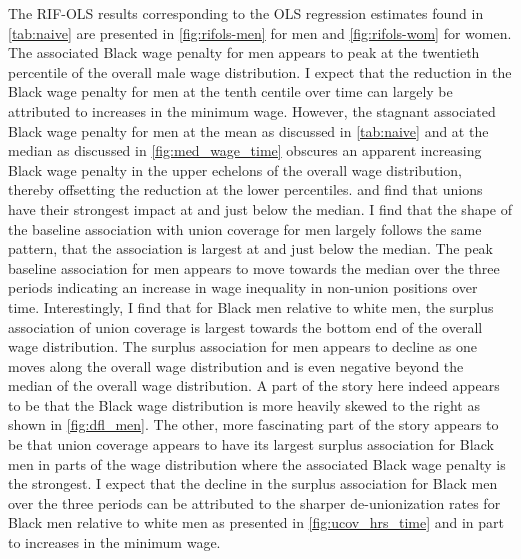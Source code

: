 \documentclass[11pt]{article}
\begin{document}
The RIF-OLS results corresponding to the OLS regression estimates found in \autoref{tab:naive} are presented in \autoref{fig:rifols-men} for men and \autoref{fig:rifols-wom} for women. The associated Black wage penalty for men appears to peak at the twentieth percentile of the overall male wage distribution. I expect that the reduction in the Black wage penalty for men at the tenth centile over time can largely be attributed to increases in the minimum wage. However, the stagnant associated Black wage penalty for men at the mean as discussed in \autoref{tab:naive} and at the median as discussed in \autoref{fig:med_wage_time} obscures an apparent increasing Black wage penalty in the upper echelons of the overall wage distribution, thereby offsetting the reduction at the lower percentiles. \citet{fll2021} and \citet{ffl2009} find that unions have their strongest impact at and just below the median. I find that the shape of the baseline association with union coverage for men largely follows the same pattern, that the association is largest at and just below the median. The peak baseline association for men appears to move towards the median over the three periods indicating an increase in wage inequality in non-union positions over time. Interestingly, I find that for Black men relative to white men, the surplus association of union coverage is largest towards the bottom end of the overall wage distribution. The surplus association for men appears to decline as one moves along the overall wage distribution and is even negative beyond the median of the overall wage distribution. A part of the story here indeed appears to be that the Black wage distribution is more heavily skewed to the right as shown in \autoref{fig:dfl_men}. The other, more fascinating part of the story appears to be that union coverage appears to have its largest surplus association for Black men in parts of the wage distribution where the associated Black wage penalty is the strongest. I expect that the decline in the surplus association for Black men over the three periods can be attributed to the sharper de-unionization rates for Black men relative to white men as presented in \autoref{fig:ucov_hrs_time} and in part to increases in the minimum wage.
\end{document}
